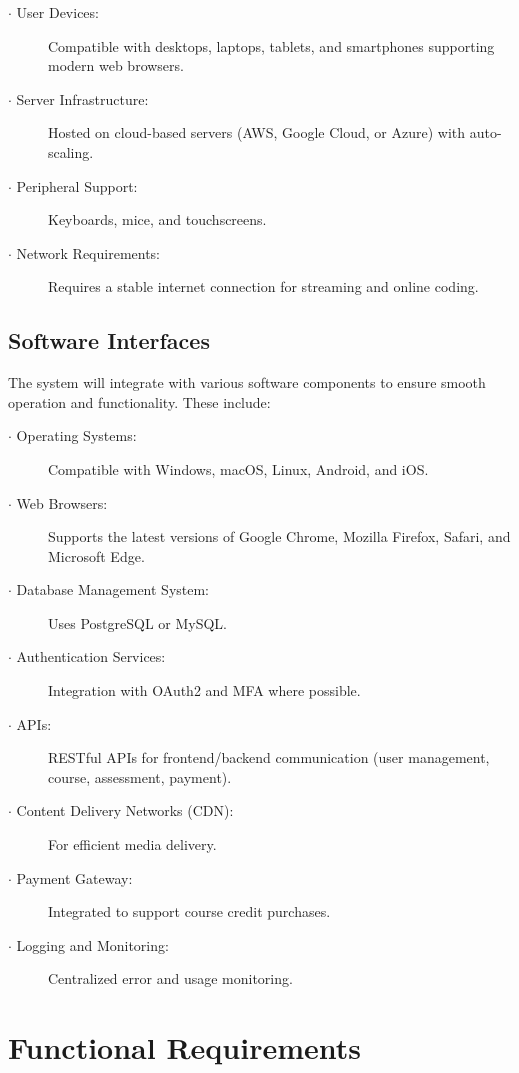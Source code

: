 \documentclass[a4paper, 11pt]{scrreprt}
\begin{document}
\begin{description}
    \item[$\cdot$ User Devices:] Compatible with desktops, laptops, tablets, and smartphones supporting modern web browsers.
    \item[$\cdot$ Server Infrastructure:] Hosted on cloud-based servers (AWS, Google Cloud, or Azure) with auto-scaling.
    \item[$\cdot$ Peripheral Support:] Keyboards, mice, and touchscreens.
    \item[$\cdot$ Network Requirements:] Requires a stable internet connection for streaming and online coding.
\end{description}

\subsection{Software Interfaces}

The system will integrate with various software components to ensure smooth operation and functionality. These include:

\begin{description}
    \item[$\cdot$ Operating Systems:] Compatible with Windows, macOS, Linux, Android, and iOS.
    \item[$\cdot$ Web Browsers:] Supports the latest versions of Google Chrome, Mozilla Firefox, Safari, and Microsoft Edge.
    \item[$\cdot$ Database Management System:] Uses PostgreSQL or MySQL.
    \item[$\cdot$ Authentication Services:] Integration with OAuth2 and MFA where possible.
    \item[$\cdot$ APIs:] RESTful APIs for frontend/backend communication (user management, course, assessment, payment).
    \item[$\cdot$ Content Delivery Networks (CDN):] For efficient media delivery.
    \item[$\cdot$ Payment Gateway:] Integrated to support course credit purchases.
    \item[$\cdot$ Logging and Monitoring:] Centralized error and usage monitoring.
\end{description}

\section{Functional Requirements}
\end{document}
